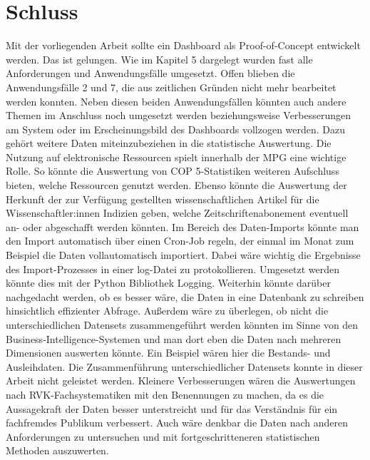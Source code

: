 
\chapter{Schluss}
\label{chap:six}
Mit der vorliegenden Arbeit sollte ein Dashboard als Proof-of-Concept entwickelt werden.
Das ist gelungen. Wie im Kapitel 5 dargelegt wurden fast alle Anforderungen und Anwendungsfälle umgesetzt.
Offen blieben die Anwendungsfälle 2 und 7, die aus zeitlichen Gründen nicht mehr bearbeitet werden konnten.
Neben diesen beiden Anwendungsfällen könnten auch andere Themen im Anschluss noch umgesetzt werden beziehungsweise
Verbesserungen am System oder im Erscheinungsbild des Dashboards vollzogen werden. Dazu gehört weitere Daten miteinzubeziehen
in die statistische Auswertung. Die Nutzung auf elektronische Ressourcen spielt innerhalb der MPG eine wichtige Rolle.
So könnte die Auswertung von \acrshort{COP 5}-Statistiken weiteren Aufschluss bieten, welche Ressourcen genutzt werden.
Ebenso könnte die Auswertung der Herkunft der zur Verfügung gestellten wissenschaftlichen Artikel für die Wissenschaftler:innen
Indizien geben, welche Zeitschriftenabonement eventuell an- oder abgeschafft werden könnten.
Im Bereich des Daten-Imports könnte man den Import automatisch über einen Cron-Job regeln, der einmal im Monat zum Beispiel die
Daten vollautomatisch importiert. Dabei wäre wichtig die Ergebnisse des Import-Prozesses in einer log-Datei zu protokollieren.
Umgesetzt werden könnte dies mit der Python Bibliothek Logging. Weiterhin könnte darüber nachgedacht werden, ob es
besser wäre, die Daten in eine Datenbank zu schreiben hinsichtlich effizienter Abfrage. Außerdem wäre zu überlegen, ob nicht die
unterschiedlichen Datensets zusammengeführt werden könnten im Sinne von den Business-Intelligence-Systemen und man dort eben
die Daten nach mehreren Dimensionen auswerten könnte. Ein Beispiel wären hier die Bestands- und Ausleihdaten. Die Zusammenführung
unterschiedlicher Datensets konnte in dieser Arbeit nicht geleistet werden.
Kleinere Verbesserungen wären die Auswertungen nach RVK-Fachsystematiken mit den Benennungen zu machen, da es die Aussagekraft der
Daten besser unterstreicht und für das Verständnis für ein fachfremdes Publikum verbessert.
Auch wäre denkbar die Daten nach anderen Anforderungen zu untersuchen und mit fortgeschritteneren statistischen Methoden auszuwerten.
